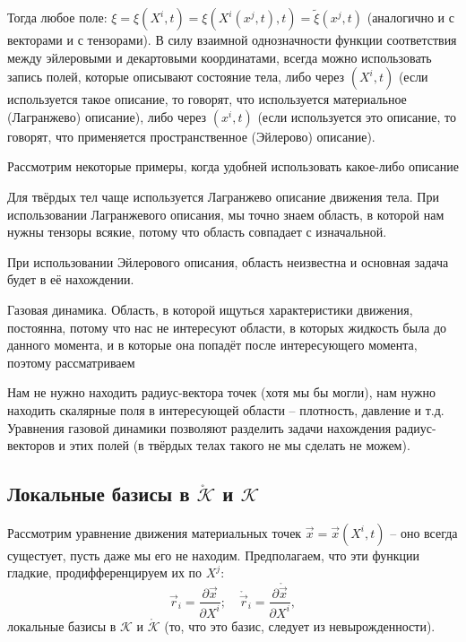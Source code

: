Тогда любое поле: $\xi = \xi(X^i, t) = \xi(X^i(x^j, t), t) = \tilde{\xi} (x^j, t)$ (аналогично и с
векторами и с тензорами). В силу взаимной однозначности функции соответствия между эйлеровыми и 
декартовыми координатами, всегда можно использовать запись полей, которые описывают состояние
тела, либо через $(X^i, t)$ (если используется такое описание, то говорят, что используется
материальное (Лагранжево) описание), либо через $(x^i, t)$ (если используется это описание, то 
говорят, что применяется пространственное (Эйлерово) описание).

Рассмотрим некоторые примеры, когда удобней использовать какое-либо описание

\begin{example} 
  Для твёрдых тел чаще используется Лагранжево описание движения тела.
  При использовании Лагранжевого описания, мы точно знаем область, в которой нам нужны тензоры
  всякие, потому что область совпадает с изначальной.

  При использовании Эйлерового описания, область неизвестна и основная задача будет в её
  нахождении.
\end{example}

\begin{example}
  Газовая динамика.
  Область, в которой ищуться характеристики движения, постоянна, потому что нас не интересуют
  области, в которых жидкость была до данного момента, и в которые она попадёт после интересующего 
  момента, поэтому рассматриваем

  Нам не нужно находить радиус-вектора точек (хотя мы бы могли), нам нужно находить скалярные поля
  в интересующей области -- плотность, давление и т.д. Уравнения газовой динамики позволяют разделить
  задачи нахождения радиус-векторов и этих полей (в твёрдых телах такого не мы сделать не можем).
\end{example}

\subsection{Локальные базисы в $\mathring{\mathcal{K}}$ и $\mathcal{K}$}

Рассмотрим уравнение движения материальных точек $\vec{x} = \vec{x} (X^i, t)$ -- оно всегда
сущестует, пусть даже мы его не находим. Предполагаем, что эти функции гладкие, продифференцируем
их по $X^j$:
\[
  \vec{r}_i = \dfrac{\partial \vec{x}}{\partial X^i}; \quad
  \mathring{\vec{r}}_i = \dfrac{\partial \mathring{\vec{x}}}{\partial X^i},
\]
локальные базисы в $\mathcal{K}$ и $\mathring{\mathcal{K}}$ (то, что это базис, следует из
невырожденности).

